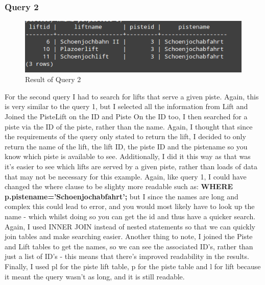 \documentclass[12pt]{article}
\begin{document}
\subsubsection{Query 2}

\clearpage
\begin{figure}[htp]
\centering
\includegraphics[scale=0.80]{Screenshots/Query2Upt(copy).png}
\caption{Result of Query 2}
\label{}
\end{figure}
For the second query I had to search for lifts that serve a given piste. Again, this is very similar to the query 1, but I selected all the information from Lift and Joined the PisteLift on the ID and Piste On the ID too, I then searched for a piste via the ID of the piste, rather than the name. Again, I thought that since the requirements of the query only stated to return the lift, I decided to only return the name of the lift, the lift ID, the piste ID and the pistename so you know which piste is available to see. Additionally, I did it this way as that was it's easier to see which lifts are served by a given piste, rather than loads of data that may not be necessary for this example. Again, like query 1, I could have changed the where clause to be slighty more readable such as: \textbf{WHERE p.pistename='Schoenjochabfahrt';} but I since the names are long and complex this could lead to error, and you would most likely have to look up the name - which whilst doing so you can get the id and thus have a quicker search. Again, I used INNER JOIN instead of nested statements so that we can quickly join tables and make searching easier. Another thing to note, I joined the Piste and Lift tables to get the names, so we can see the associated ID's, rather than just a list of ID's - this means that there's improved readability in the results. Finally, I used pl for the piste lift table, p for the piste table and l for lift because it meant the query wasn't as long, and it is still readable.
\end{document}
